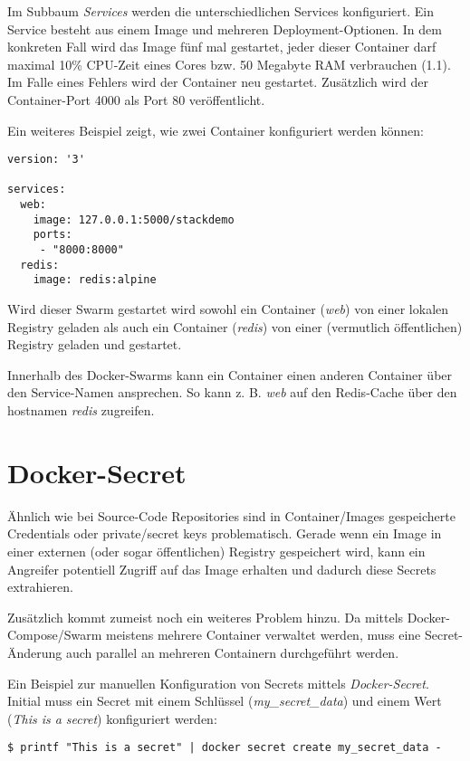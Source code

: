 Im Subbaum \textit{Services} werden die unterschiedlichen Services konfiguriert. Ein Service besteht aus einem Image und mehreren Deployment-Optionen. In dem konkreten Fall wird das Image fünf mal gestartet, jeder dieser Container darf maximal 10\% CPU-Zeit eines Cores bzw. 50 Megabyte RAM verbrauchen (1.1). Im Falle eines Fehlers wird der Container neu gestartet. Zusätzlich wird der Container-Port 4000 als Port 80 veröffentlicht.

Ein weiteres Beispiel zeigt, wie zwei Container konfiguriert werden können:

\begin{verbatim}
version: '3'

services:
  web:
    image: 127.0.0.1:5000/stackdemo
    ports:
     - "8000:8000"
  redis:
    image: redis:alpine
\end{verbatim}

Wird dieser Swarm gestartet wird sowohl ein Container (\textit{web}) von einer lokalen Registry geladen als auch ein Container (\textit{redis}) von einer (vermutlich öffentlichen) Registry geladen und gestartet.

Innerhalb des Docker-Swarms kann ein Container einen anderen Container über den Service-Namen ansprechen. So kann z. B. \textit{web} auf den Redis-Cache über den hostnamen \textit{redis} zugreifen.

\section{Docker-Secret}

Ähnlich wie bei Source-Code Repositories sind in Container/Images gespeicherte Credentials oder private/secret keys problematisch. Gerade wenn ein Image in einer externen (oder sogar öffentlichen) Registry gespeichert wird, kann ein Angreifer potentiell Zugriff auf das Image erhalten und dadurch diese Secrets extrahieren.

Zusätzlich kommt zumeist noch ein weiteres Problem hinzu. Da mittels Docker-Compose/Swarm meistens mehrere Container verwaltet werden, muss eine Secret-Änderung auch parallel an mehreren Containern durchgeführt werden.

Ein Beispiel zur manuellen Konfiguration von Secrets mittels \textit{Docker-Secret}. Initial muss ein Secret mit einem Schlüssel (\textit{my\_secret\_data}) und einem Wert (\textit{This is a secret}) konfiguriert werden:

\begin{verbatim}
$ printf "This is a secret" | docker secret create my_secret_data -
\end{verbatim}

